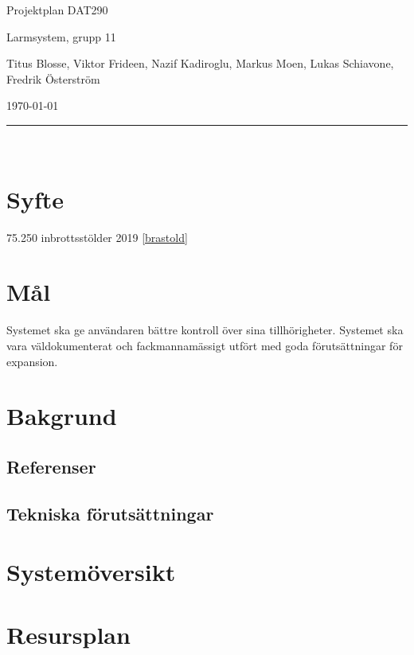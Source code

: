 \documentclass{article}
\begin{document}
\begin{center}
\thispagestyle{empty}
\parskip=14pt%
\vspace*{3\parskip}%

{\LARGE Projektplan DAT290}

{\large Larmsystem, grupp 11

Titus Blosse, Viktor Frideen, Nazif Kadiroglu, Markus Moen, Lukas Schiavone, Fredrik Österström

\today}


\rule{7cm}{0.4pt}\\
\end{center}
\newpage

\thispagestyle{empty}
\tableofcontents
\newpage


\section{Syfte}

75.250 inbrottsstölder 2019 \ref{brastold}

\section{Mål}

Systemet ska ge användaren bättre kontroll över sina tillhörigheter. Systemet ska vara väldokumenterat och fackmannamässigt utfört med goda förutsättningar för expansion.

\section{Bakgrund}

\subsection{Referenser}

\subsection{Tekniska förutsättningar}

\section{Systemöversikt}

\section{Resursplan}
\end{document}
